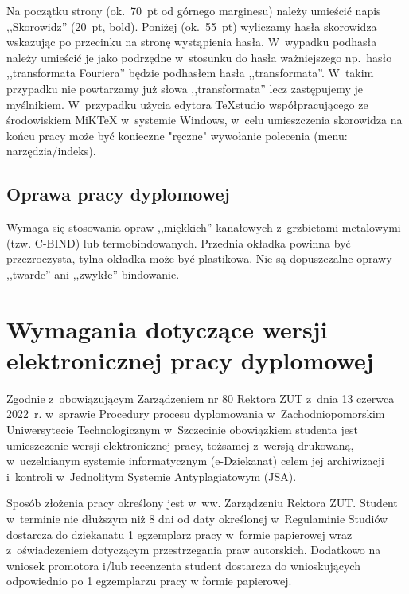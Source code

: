 \documentclass[skorowidz,skroty]{dyplomWEZUT}
\begin{document}
Na początku strony (ok.~70~pt od górnego marginesu) należy umieścić napis ,,Skorowidz'' (20~pt, bold). Poniżej (ok.~55~pt) wyliczamy hasła skorowidza wskazując po przecinku na stronę wystąpienia hasła. W~wypadku podhasła należy umieścić je jako podrzędne w~stosunku do hasła ważniejszego np.~hasło ,,transformata Fouriera'' będzie podhasłem hasła ,,transformata''. W~takim przypadku nie powtarzamy już słowa ,,transformata'' lecz zastępujemy je myślnikiem. W~przypadku użycia edytora TeXstudio współpracującego ze środowiskiem MiKTeX w~systemie Windows, w~celu umieszczenia skorowidza na końcu pracy może być konieczne "ręczne" wywołanie polecenia (menu: narzędzia/indeks).


\section{Oprawa pracy dyplomowej}\label{sec:oprawa}

Wymaga się stosowania opraw ,,miękkich'' kanałowych z~grzbietami metalowymi (tzw. C-BIND) lub termobindowanych. Przednia okładka powinna być przezroczysta, tylna okładka może być plastikowa. Nie są dopuszczalne oprawy ,,twarde'' ani ,,zwykłe'' bindowanie.

\chapter{Wymagania dotyczące wersji elektronicznej pracy dyplomowej}\label{chap:welektroniczna}

Zgodnie z~obowiązującym Zarządzeniem nr 80 Rektora ZUT z~dnia 13 czerwca 2022~r. w~sprawie Procedury procesu dyplomowania w~Zachodniopomorskim Uniwersytecie Technologicznym w~Szczecinie obowiązkiem studenta jest umieszczenie wersji elektronicznej pracy, tożsamej z~wersją drukowaną, w~uczelnianym systemie informatycznym (e-Dziekanat) celem jej archiwizacji i~kontroli w~Jednolitym Systemie Antyplagiatowym (JSA).

Sposób złożenia pracy określony jest w~ww. Zarządzeniu Rektora ZUT. Student w~terminie nie dłuższym niż 8 dni od daty określonej w~Regulaminie Studiów dostarcza do dziekanatu 1 egzemplarz pracy w~formie papierowej wraz z~oświadczeniem dotyczącym przestrzegania praw autorskich. Dodatkowo na wniosek promotora i/lub recenzenta student dostarcza do wnioskujących odpowiednio po 1 egzemplarzu pracy w formie papierowej.
\end{document}
